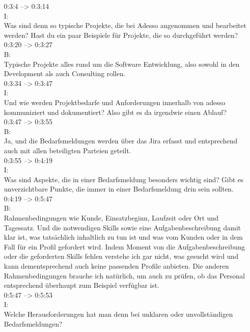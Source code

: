 0:3:4 --> 0:3:14\\
I:\\
Was sind denn so typische Projekte, die bei Adesso angenommen und bearbeitet werden? Hast du ein paar Beispiele für Projekte, die so durchgeführt werden?\\

0:3:20 --> 0:3:27\\
B:\\
Typische Projekte alles rund um die Software Entwicklung, also sowohl in den Development als auch Consulting rollen.\\

0:3:34 --> 0:3:47\\
I:\\
Und wie werden Projektbedarfe und Anforderungen innerhalb von adesso kommuniziert und dokumentiert? Also gibt es da irgendwie einen Ablauf?\\

0:3:47 --> 0:3:55\\
B:\\
Ja, und die Bedarfsmeldungen werden über das Jira erfasst und entsprechend auch mit allen beteiligten Parteien geteilt.\\

0:3:55 --> 0:4:19\\
I:\\
Was sind Aspekte, die in einer Bedarfsmeldung besonders wichtig sind? Gibt es unverzichtbare Punkte, die immer in einer Bedarfsmeldung drin sein sollten.\\

0:4:19 --> 0:5:47\\
B:\\
Rahmenbedingungen wie Kunde, Einsatzbeginn, Laufzeit oder Ort und Tagessatz. Und die notwendigen Skills sowie eine Aufgabenbeschreibung damit klar ist, was tatsächlich inhaltlich zu tun ist und was vom Kunden oder in dem Fall für ein Profil gefordert wird. Indem Moment von die Aufgabenbeschreibung oder die geforderten Skills fehlen verstehe ich gar nicht, was gesucht wird und kann dementsprechend auch keine passenden Profile anbieten. Die anderen Rahmenbedingungen brauche ich natürlich, um auch zu prüfen, ob das Personal entsprechend überhaupt zum Beispiel verfügbar ist.\\

0:5:47 --> 0:5:53\\
I:\\
Welche Herausforderungen hat man denn bei unklaren oder unvollständigen Bedarfsmeldungen?\\

